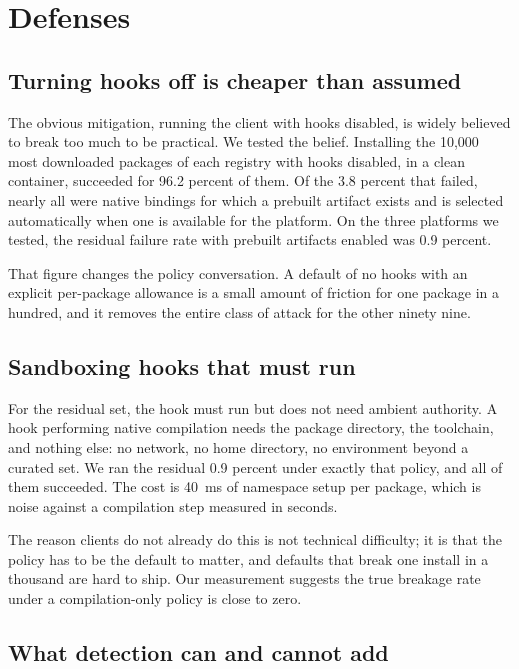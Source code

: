 \section{Defenses}
\label{sec:defenses}

\subsection{Turning hooks off is cheaper than assumed}

The obvious mitigation, running the client with hooks disabled, is widely
believed to break too much to be practical. We tested the belief. Installing
the 10{,}000 most downloaded packages of each registry with hooks disabled, in
a clean container, succeeded for 96.2 percent of them. Of the 3.8 percent that
failed, nearly all were native bindings for which a prebuilt artifact exists
and is selected automatically when one is available for the platform. On the
three platforms we tested, the residual failure rate with prebuilt artifacts
enabled was 0.9 percent.

That figure changes the policy conversation. A default of no hooks with an
explicit per-package allowance is a small amount of friction for one package in
a hundred, and it removes the entire class of attack for the other ninety nine.

\subsection{Sandboxing hooks that must run}

For the residual set, the hook must run but does not need ambient authority. A
hook performing native compilation needs the package directory, the toolchain,
and nothing else: no network, no home directory, no environment beyond a
curated set. We ran the residual 0.9 percent under exactly that policy, and all
of them succeeded. The cost is 40~ms of namespace setup per package, which is
noise against a compilation step measured in seconds.

The reason clients do not already do this is not technical difficulty; it is
that the policy has to be the default to matter, and defaults that break one
install in a thousand are hard to ship. Our measurement suggests the true
breakage rate under a compilation-only policy is close to zero.

\subsection{What detection can and cannot add}

